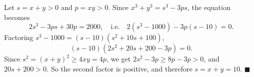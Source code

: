 Let $s=x+y>0$ and $p=xy>0$. Since $x^3+y^3=s^3-3ps$, the equation becomes
\[2s^3-3ps+30p=2000,\quad\text{i.e.}\quad 2\left(s^3-1000\right)-3p(s-10)=0.\]
Factoring $s^3-1000=(s-10)(s^2+10s+100)$,
\[(s-10)\left(2s^2+20s+200-3p\right)=0.\]
Since $s^2=(x+y)^2\ge4xy=4p$, we get $2s^2-3p\ge8p-3p>0$, and $20s+200>0$. So the second factor is positive, and therefore $s=x+y=10$. $\blacksquare$
